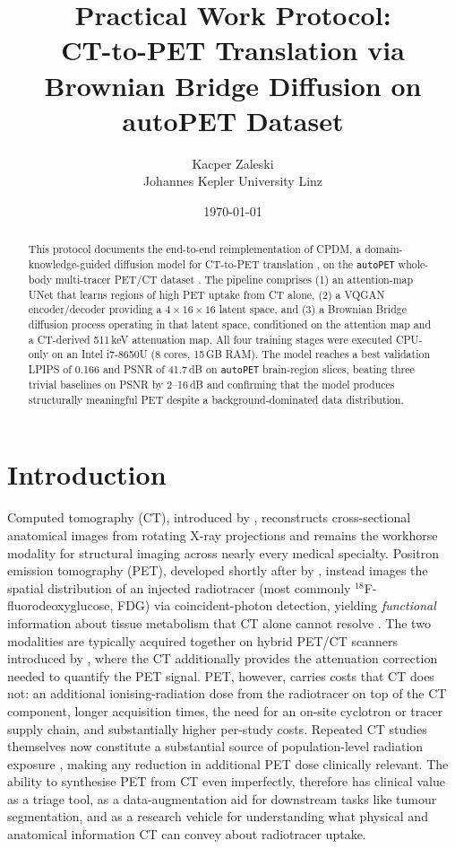 \documentclass[11pt,a4paper]{article}
\title{Practical Work Protocol:\\[0.3em]
CT-to-PET Translation via Brownian Bridge Diffusion on autoPET Dataset}
\author{Kacper Zaleski\\Johannes Kepler University Linz}
\date{\today}
\begin{document}
\maketitle

\begin{abstract}
This protocol documents the end-to-end reimplementation of CPDM, a 
domain-knowledge-guided diffusion model for CT-to-PET translation 
\parencite{nguyen2025cpdm}, on the \texttt{autoPET} whole-body
multi-tracer PET/CT dataset \parencite{gatidis2022autopet, jeblick2024psma}. The pipeline comprises (1)
an attention-map UNet that learns regions of high PET uptake from CT alone, (2) 
a VQGAN encoder/decoder providing a $4 \times 16 \times 16$ latent space, and (3) 
a Brownian Bridge diffusion process \parencite{li2023bbdm} operating in that latent 
space, conditioned on the attention map and a CT-derived 511\,keV attenuation map. 
All four training stages were executed CPU-only on an Intel i7-8650U 
(8 cores, 15\,GB RAM). The model reaches a best validation LPIPS of 0.166 and 
PSNR of 41.7\,dB on \texttt{autoPET} brain-region slices, beating three trivial 
baselines on PSNR by 2--16\,dB and confirming that the model produces structurally
meaningful PET despite a background-dominated data distribution.
\end{abstract}

\tableofcontents
\bigskip

\section{Introduction}

Computed tomography (CT), introduced by \textcite{hounsfield1973ct}, reconstructs 
cross-sectional anatomical images from rotating X-ray projections and remains the 
workhorse modality for structural imaging across nearly every medical specialty. 
Positron emission tomography (PET), developed shortly after 
by \textcite{phelps1975pet}, instead images the spatial distribution of an 
injected radiotracer (most commonly $^{18}$F-fluorodeoxyglucose, FDG) via 
coincident-photon detection, yielding \emph{functional} information about 
tissue metabolism that CT alone cannot resolve \parencite{gambhir2002pet}. 
The two modalities are typically acquired together on hybrid PET/CT scanners 
introduced by \textcite{beyer2000petct}, where the CT additionally provides 
the attenuation correction needed to quantify the PET signal. PET, however, 
carries costs that CT does not: an additional ionising-radiation dose from 
the radiotracer on top of the CT component, longer acquisition times, the need 
for an on-site cyclotron or tracer supply chain, and substantially higher per-study 
costs. Repeated CT studies themselves now constitute a substantial source of 
population-level radiation exposure \parencite{brennerhall2007ctdose}, making 
any reduction in additional PET dose clinically relevant. The ability to 
synthesise PET from CT even imperfectly, therefore has clinical value as a 
triage tool, as a data-augmentation aid for downstream tasks like tumour 
segmentation, and as a research vehicle for understanding what physical and 
anatomical information CT can convey about radiotracer uptake.
\end{document}
